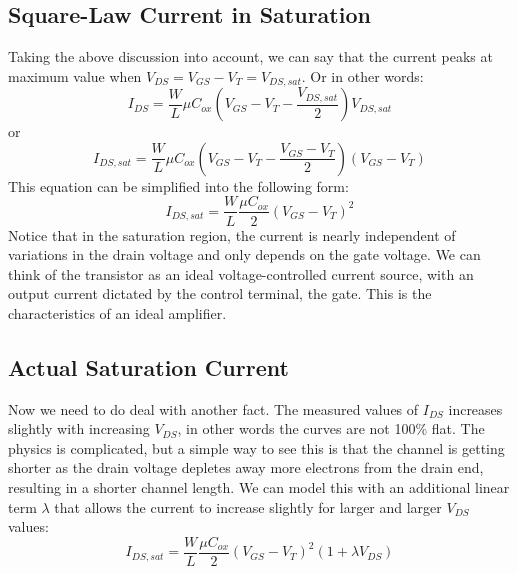 \subsection{Square-Law Current in Saturation}
Taking the above discussion into account, we can say that the current peaks at maximum value when 
$V_{DS} = V_{GS} - V_{T} = V_{DS,sat}$.  Or in other words:
    \begin{equation}
        I_{DS} = \frac{W}{L}\mu {C_{ox}}({V_{GS}} - {V_T} - \frac{{{V_{DS,sat}}}}{2}){V_{DS,sat}}
    \end{equation}
or 
    \begin{equation}
        {I_{DS,sat}} = \frac{W}{L}\mu {C_{ox}}({V_{GS}} - {V_T} - \frac{{{V_{GS}} - {V_T}}}{2})({V_{GS}} - {V_T})
    \end{equation}
This equation can be simplified into the following form:
    \begin{equation}
        {I_{DS,sat}} = \frac{W}{L}\frac{{\mu {C_{ox}}}}{2}{({V_{GS}} - {V_T})^2}
    \end{equation}
Notice that in the saturation region, the current is nearly independent of variations in the drain voltage and only depends on the gate voltage.  We can think of the transistor as an ideal voltage-controlled current source, with an output current dictated by the control terminal, the gate.  This is the characteristics of an ideal amplifier.
\subsection{Actual Saturation Current}
Now we need to do deal with another fact.  The measured values of  $I_{DS}$ increases slightly with increasing $V_{DS}$, in other words the curves are not 100\% flat.   The physics is complicated, but a simple way to see this is that the channel is getting shorter as the drain voltage depletes away more electrons from the drain end, resulting in a shorter channel length.   We can model this with an additional linear term $\lambda$ that allows the current to increase slightly for larger and larger $V_{DS}$ values:
    \begin{equation}
        {I_{DS,sat}} = \frac{W}{L}\frac{{\mu {C_{ox}}}}{2}{({V_{GS}} - {V_T})^2}(1 + \lambda {V_{DS}})
    \end{equation}
